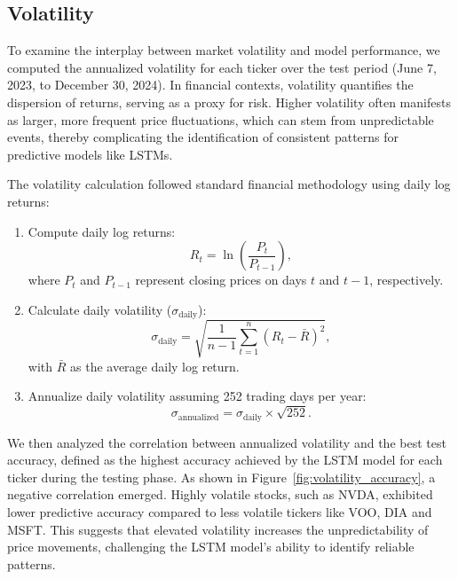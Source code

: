 \documentclass[10pt,a4paper]{article}
\begin{document}
\subsection{Volatility}

To examine the interplay between market volatility and model performance, we computed the annualized volatility for each ticker over the test period (June 7, 2023, to December 30, 2024). In financial contexts, volatility quantifies the dispersion of returns, serving as a proxy for risk. Higher volatility often manifests as larger, more frequent price fluctuations, which can stem from unpredictable events, thereby complicating the identification of consistent patterns for predictive models like LSTMs.

The volatility calculation followed standard financial methodology using daily log returns:


\begin{enumerate}
    \item Compute daily log returns:
    \begin{equation}
    R_t = \ln\left(\frac{P_t}{P_{t-1}}\right),
    \end{equation}
    where \(P_t\) and \(P_{t-1}\) represent closing prices on days \(t\) and \(t-1\), respectively.
    
    \item Calculate daily volatility (\(\sigma_{\text{daily}}\)):
    \begin{equation}
    \sigma_{\text{daily}} = \sqrt{\frac{1}{n-1}\sum_{t=1}^{n}(R_t - \bar{R})^2},
    \end{equation}
    with \(\bar{R}\) as the average daily log return.

    \item Annualize daily volatility assuming 252 trading days per year:
    \begin{equation}
    \sigma_{\text{annualized}} = \sigma_{\text{daily}} \times \sqrt{252}.
    \end{equation}
\end{enumerate}

We then analyzed the correlation between annualized volatility and the best test accuracy, defined as the highest accuracy achieved by the LSTM model for each ticker during the testing phase. As shown in Figure~\ref{fig:volatility_accuracy}, a negative correlation emerged. Highly volatile stocks, such as NVDA, exhibited lower predictive accuracy compared to less volatile tickers like VOO, DIA and MSFT. This suggests that elevated volatility increases the unpredictability of price movements, challenging the LSTM model's ability to identify reliable patterns.
\end{document}
